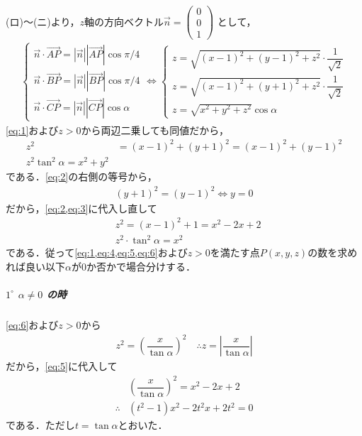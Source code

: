 \documentclass[../../main.tex]{subfiles}
\begin{document}
(ロ)～(ニ)より，$z$軸の方向ベクトル$\vec{n} =
\begin{pmatrix} 0 \\ 0 \\ 1
\end{pmatrix}$ として，
\begin{align}
  \begin{cases}
    \vec{n} \cdot \overrightarrow{AP} = |\vec{n}| |\overrightarrow{AP}| \cos\pi/4 \\
    \vec{n} \cdot \overrightarrow{BP} = |\vec{n}| |\overrightarrow{BP}| \cos\pi/4 \\
    \vec{n} \cdot \overrightarrow{CP} = |\vec{n}| |\overrightarrow{CP}| \cos\alpha
  \end{cases}
  \iff
  \begin{cases}
    z = \sqrt{(x-1)^2 + (y-1)^2 + z^2} \cdot \dfrac{1}{\sqrt{2}} \\
    z = \sqrt{(x-1)^2 + (y+1)^2 + z^2} \cdot \dfrac{1}{\sqrt{2}} \\
    z = \sqrt{x^2 + y^2 + z^2} \cos\alpha
  \end{cases}
\end{align}
\cref{eq:1}および$z>0$から両辺二乗しても同値だから，
\begin{align}
  z^2 &= (x-1)^2 + (y+1)^2 = (x-1)^2 + (y-1)^2  \label{eq:2} \\
  z^2 \tan^2\alpha = x^2 + y^2 \label{eq:3}
\end{align}
である．\cref{eq:2}の右側の等号から，
\begin{align}
  (y+1)^2 = (y-1)^2 \iff y=0 \label{eq:4}
\end{align}
だから，\cref{eq:2,eq:3}に代入し直して
\begin{align}
  & z^2 = (x-1)^2 + 1 = x^2 - 2x + 2  \label{eq:5} \\
  & z^2 \cdot \tan^2\alpha = x^2  \label{eq:6}
\end{align}
である．従って\cref{eq:1,eq:4,eq:5,eq:6}および$z>0$を満たす点$P(x,y,z)$の数を求めれば良い以下$\alpha$が$0$か否かで場合分けする．

\subparagraph{$1^\circ$ $\alpha \neq 0$ の時}

\cref{eq:6}および$z>0$から
\begin{align}
  z^2 = \left(\dfrac{x}{\tan\alpha}\right)^2 \quad \therefore z = \left|\dfrac{x}{\tan\alpha}\right| \label{eq:7}
\end{align}
だから，\cref{eq:5}に代入して
\begin{align}
  & \left(\dfrac{x}{\tan\alpha}\right)^2 = x^2-2x+2 \\
  \therefore
  & (t^2-1) x^2 - 2t^2 x + 2t^2 = 0 \label{eq:8}
\end{align}
である．ただし$t=\tan\alpha$とおいた．
\end{document}
